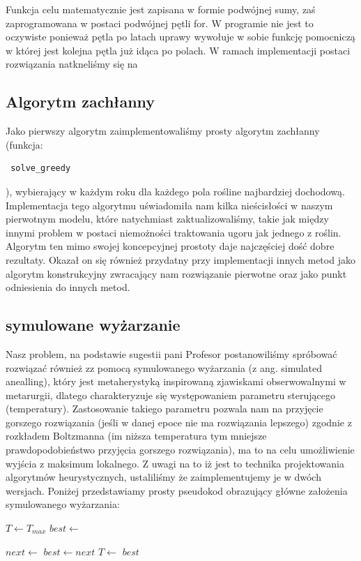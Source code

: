 \documentclass{article}
\begin{document}
Funkcja celu matematycznie jest zapisana w formie podwójnej sumy, zaś zaprogramowana w postaci podwójnej pętli for.
	W programie nie jest to oczywiste ponieważ pętla po latach uprawy wywołuje w sobie funkcję pomocniczą w której jest kolejna pętla już idąca po polach.
W ramach implementacji postaci rozwiązania natkneliśmy się na

\subsection{Algorytm zachłanny}
Jako pierwszy algorytm zaimplementowaliśmy prosty algorytm zachłanny (funkcja:\begin{verbatim} solve_greedy \end{verbatim}), wybierający w każdym roku dla każdego pola rośline najbardziej dochodową. Implementacja tego algorytmu uświadomiła nam kilka nieścisłości w naszym pierwotnym modelu, które natychmiast zaktualizowaliśmy, takie jak między innymi problem w postaci niemożności traktowania ugoru jak jednego z roślin. Algorytm ten mimo swojej koncepcyjnej prostoty daje najczęściej dość dobre rezultaty. Okazał on się również przydatny przy implementacji innych metod jako algorytm konstrukcyjny zwracający nam rozwiązanie pierwotne oraz jako punkt odniesienia do innych metod.

\subsection{symulowane wyżarzanie}
Nasz problem, na podstawie sugestii pani Profesor postanowiliśmy spróbować rozwiązać również zz pomocą  symulowanego wyżarzania (z ang. simulated anealling), który jest metaherystyką inspirowaną zjawiskami obserwowalnymi w metarurgii, dlatego charakteryzuje się występowaniem parametru sterującego (temperatury). Zastosowanie takiego parametru pozwala nam na przyjęcie gorszego rozwiązania (jeśli w danej epoce nie ma rozwiązania lepszego) zgodnie z rozkładem Boltzmanna (im niższa temperatura tym mniejsze prawdopodobieństwo przyjęcia gorszego rozwiązania), ma to na celu umożliwienie wyjścia z maksimum lokalnego. Z uwagi na to iż jest to technika projektowania algorytmów heurystycznych, ustaliliśmy że zaimplementujemy je w dwóch wersjach.
Poniżej przedstawiamy prosty pseudokod obrazujący główne założenia symulowanego wyżarzania:
\newpage

\begin{algorithmic}
\State $T\gets T_{max}$
\State $best\gets$ \textbf{}

	\State $next\gets $ \textbf{}
      \State $best\gets next$
	\EndIf
	\State $T\gets$ \textbf{}
\EndWhile
\Return $best$
\EndFunction
\end{algorithmic}
\end{document}
